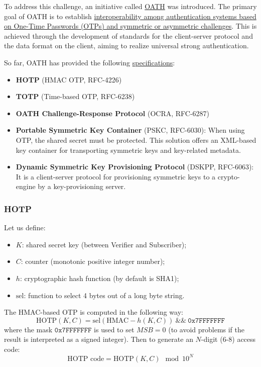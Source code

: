 To address this challenge, an initiative called \href{http://www.openauthentication.org/}{OATH} was introduced. The primary goal of OATH is to establish \ul{interoperability among authentication systems based on One-Time Passwords (OTPs) and symmetric or asymmetric challenges}. This is achieved through the development of standards for the client-server protocol and the data format on the client, aiming to realize universal strong authentication.

So far, OATH has provided the following \href{http://www.openauthentication.org/specifications}{specifications}:
\begin{itemize}
  \item \textbf{HOTP} (HMAC OTP, RFC-4226)
  \item \textbf{TOTP} (Time-based OTP, RFC-6238)
  \item \textbf{OATH Challenge-Response Protocol} (OCRA, RFC-6287)
  \item \textbf{Portable Symmetric Key Container} (PSKC, RFC-6030): When using OTP, the shared secret must be protected. This solution offers an XML-based key container for transporting symmetric keys and key-related metadata.
  \item \textbf{Dynamic Symmetric Key Provisioning Protocol} (DSKPP, RFC-6063): It is a client-server protocol for provisioning symmetric keys to a crypto-engine by a key-provisioning server.
\end{itemize}

\subsubsection*{HOTP}

Let us define:
\begin{itemize}
  \item \(K\): shared secret key (between Verifier and Subscriber);
  \item \(C\): counter (monotonic positive integer number);
  \item \(h\): cryptographic hash function (by default is SHA1);
  \item \(\text{sel}\): function to select 4 bytes out of a long byte string.
\end{itemize}

The HMAC-based OTP is computed in the following way:
\[
  \text{HOTP}(K, C) = \text{sel}(\text{HMAC}-h(K, C)) \ \&\& \ \mathtt{0x7FFFFFFF}
\]
where the mask \(\mathtt{0x7FFFFFFF}\) is used to set \(MSB=0\) (to avoid problems if the result is interpreted as a signed integer). Then to generate an \(N\)-digit (6-8) access code:
\[
  \text{HOTP code} = \text{HOTP}(K, C) \mod 10^N
\]

